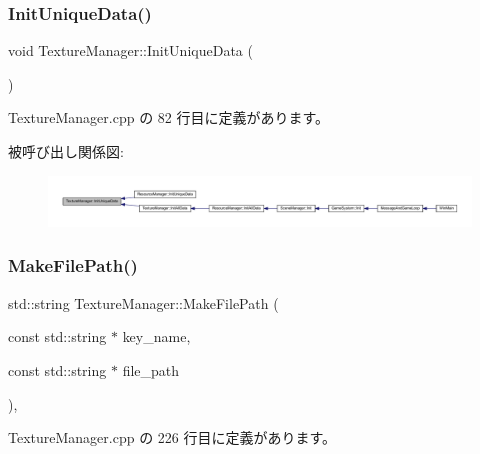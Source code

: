 \subsubsection{\texorpdfstring{Init\+Unique\+Data()}{InitUniqueData()}}
{\footnotesize\ttfamily void Texture\+Manager\+::\+Init\+Unique\+Data (\begin{DoxyParamCaption}{ }\end{DoxyParamCaption})\hspace{0.3cm}{\ttfamily [static]}}



 Texture\+Manager.\+cpp の 82 行目に定義があります。

被呼び出し関係図\+:
\nopagebreak
\begin{figure}[H]
\begin{center}
\leavevmode
\includegraphics[width=350pt]{class_texture_manager_abfba2c4293e692a351d9b98e28f6ed31_icgraph}
\end{center}
\end{figure}
\mbox{\label{class_texture_manager_a950562ff671a620592708906925fad7f}} 
\subsubsection{\texorpdfstring{Make\+File\+Path()}{MakeFilePath()}}
{\footnotesize\ttfamily std\+::string Texture\+Manager\+::\+Make\+File\+Path (\begin{DoxyParamCaption}\item[{const std\+::string $\ast$}]{key\+\_\+name,  }\item[{const std\+::string $\ast$}]{file\+\_\+path }\end{DoxyParamCaption})\hspace{0.3cm}{\ttfamily [static]}, {\ttfamily [private]}}



 Texture\+Manager.\+cpp の 226 行目に定義があります。

